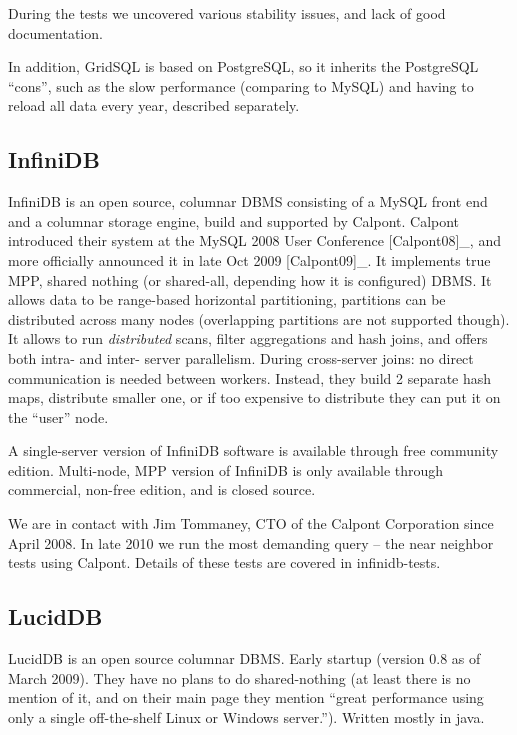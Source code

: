 \documentclass[DM,lsstdraft,toc]{lsstdoc}
\begin{document}
During the tests we uncovered various stability issues, and lack of good
documentation.

In addition, GridSQL is based on PostgreSQL, so it inherits the
PostgreSQL ``cons'', such as the slow performance (comparing to MySQL)
and having to reload all data every year, described separately.

\subsection{InfiniDB}\label{infinidb}

InfiniDB is an open source, columnar DBMS consisting of a MySQL front
end and a columnar storage engine, build and supported by Calpont.
Calpont introduced their system at the MySQL 2008 User Conference
{[}Calpont08{]}\_, and more officially announced it in late Oct 2009
{[}Calpont09{]}\_. It implements true MPP, shared nothing (or
shared-all, depending how it is configured) DBMS. It allows data to be
range-based horizontal partitioning, partitions can be distributed
across many nodes (overlapping partitions are not supported though). It
allows to run \emph{distributed} scans, filter aggregations and hash
joins, and offers both intra- and inter- server parallelism. During
cross-server joins: no direct communication is needed between workers.
Instead, they build 2 separate hash maps, distribute smaller one, or if
too expensive to distribute they can put it on the ``user'' node.

A single-server version of InfiniDB software is available through free
community edition. Multi-node, MPP version of InfiniDB is only available
through commercial, non-free edition, and is closed source.

We are in contact with Jim Tommaney, CTO of the Calpont Corporation
since April 2008. In late 2010 we run the most demanding query -- the
near neighbor tests using Calpont. Details of these tests are covered in
infinidb-tests.

\subsection{LucidDB}\label{luciddb}

LucidDB is an open source columnar DBMS. Early startup (version 0.8 as
of March 2009). They have no plans to do shared-nothing (at least there
is no mention of it, and on their main page they mention ``great
performance using only a single off-the-shelf Linux or Windows
server.''). Written mostly in java.
\end{document}

